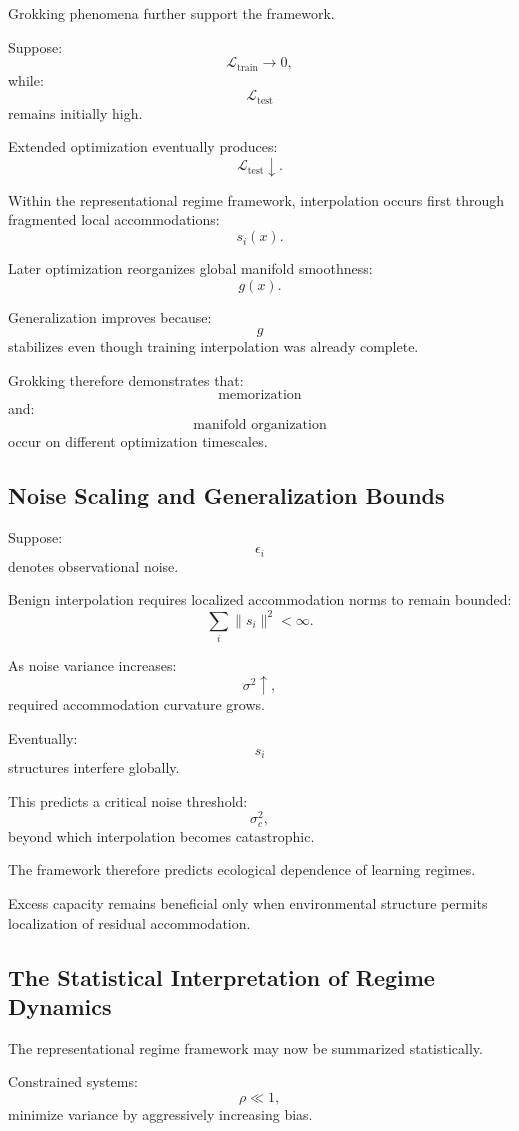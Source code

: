 \documentclass[12pt,a4paper]{article}
\begin{document}
Grokking phenomena further support the framework.

Suppose:
\[
\mathcal{L}_{\text{train}}
\rightarrow
0,
\]
while:
\[
\mathcal{L}_{\text{test}}
\]
remains initially high.

Extended optimization eventually produces:
\[
\mathcal{L}_{\text{test}}
\downarrow.
\]

Within the representational regime framework, interpolation occurs first through fragmented local accommodations:
\[
s_i(x).
\]

Later optimization reorganizes global manifold smoothness:
\[
g(x).
\]

Generalization improves because:
\[
g
\]
stabilizes even though training interpolation was already complete.

Grokking therefore demonstrates that:
\[
\text{memorization}
\]
and:
\[
\text{manifold organization}
\]
occur on different optimization timescales.

\subsection{Noise Scaling and Generalization Bounds}

Suppose:
\[
\epsilon_i
\]
denotes observational noise.

Benign interpolation requires localized accommodation norms to remain bounded:
\[
\sum_i
\|s_i\|^2
<
\infty.
\]

As noise variance increases:
\[
\sigma^2
\uparrow,
\]
required accommodation curvature grows.

Eventually:
\[
s_i
\]
structures interfere globally.

This predicts a critical noise threshold:
\[
\sigma_c^2,
\]
beyond which interpolation becomes catastrophic.

The framework therefore predicts ecological dependence of learning regimes.

Excess capacity remains beneficial only when environmental structure permits localization of residual accommodation.

\subsection{The Statistical Interpretation of Regime Dynamics}

The representational regime framework may now be summarized statistically.

Constrained systems:
\[
\rho
\ll
1,
\]
minimize variance by aggressively increasing bias.
\end{document}
